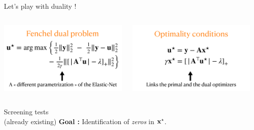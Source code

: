\documentclass[final]{beamer}
\newcommand{\emphone}[1]{\textit{\color{norange}#1}}
\newlength{\onecolwid}
\newlength{\twocolwid}
\begin{document}
\begin{frame}[t]
\begin{columns}[t]
\begin{column}{\twocolwid}
    \begin{block}{Let's play with duality !}
        \begin{columns}[t,totalwidth=\twocolwid]
            \begin{column}{\onecolwid}
                \includegraphics[width=\linewidth]{dual.pdf}
            \end{column}
            \begin{column}{\onecolwid}
                \includegraphics[width=\linewidth]{optcond.pdf}
            \end{column}
        \end{columns}
    \end{block}
    \begin{columns}[t,totalwidth=\twocolwid]
        \begin{column}{\onecolwid}\vspace{-.6in} 
            \begin{alertblock}{Screening tests\\ {\small{(already existing)}}}
                \textbf{Goal :} Identification of \emphone{zeros} in $\mathbf{x}^\star$. \\

\end{alertblock}
\end{column}
\end{columns}
\end{column}
\end{columns}
\end{frame}
\end{document}
